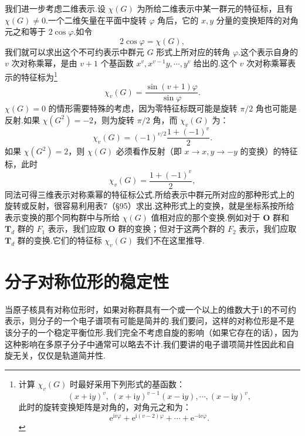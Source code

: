 我们进一步考虑二维表示.设 $\chi(G)$ 为所给二维表示中某一群元的特征标，且有 $\chi(G)\neq0$.一个二维矢量在平面中旋转 $\varphi$ 角后，它的 $x,y$ 分量的变换矩阵的对角元之和等于 $2\cos\varphi$.如令
\begin{equation}
  2\cos\varphi=\chi(G),
\end{equation}
我们就可以求出这个不可约表示中群元 $G$ 形式上所对应的转角 $\varphi$.这个表示自身的 $v$ 次对称乘幂，是由 $v+1$ 个基函数 $x^v,x^{v-1}y,\cdots,y^v$ 给出的.这个 $v$ 次对称乘幂表示的特征标为\footnote{计算 $\chi_v(G)$ 时最好采用下列形式的基函数：
\begin{equation*}
  (x+\mathrm{i}y)^v,\ (x+\mathrm{i}y)^{v-1}(x-\mathrm{i}y),\cdots,(x-\mathrm{i}y)^v,
\end{equation*}
此时的旋转变换矩阵是对角的，对角元之和为：
\begin{equation*}
  \mathrm{e}^{\mathrm{i}v\varphi}+\mathrm{e}^{\mathrm{i}(v-2)\varphi}+\cdots+\mathrm{e}^{-\mathrm{i}v\varphi}.
\end{equation*}}
\begin{equation}
  \chi_v(G)=\frac{\sin(v+1)\varphi}{\sin\varphi}.
\end{equation}
$\chi(G)=0$ 的情形需要特殊的考虑，因为零特征标既可能是旋转 $\pi/2$ 角也可能是反射.如果 $\chi(G^2)=-2$，则为旋转 $\pi/2$ 角，而 $\chi_v(G)$ 为：
\begin{equation}
  \chi_v(G)=(-1)^{v/2}\frac{1+(-1)^v}{2}.
\end{equation}
如果 $\chi(G^2)=2$，则 $\chi(G)$ 必须看作反射（即 $x\longrightarrow x,y\longrightarrow-y$ 的变换）的特征标，此时
\begin{equation}
  \chi_v(G)=\frac{1+(-1)^v}{2},
\end{equation}
同法可得三维表示对称乘幂的特征标公式.所给表示中群元所对应的那种形式上的旋转或反射，很容易利用表7（§95）求出.这种形式上的变换，就是坐标系按所给表示变换的那个同构群中与所给 $\chi(G)$ 值相对应的那个变换.例如对于 $\boldsymbol{O}$ 群和 $\boldsymbol{T}_d$ 群的 $F_1$ 表示，我们应取 $\boldsymbol{O}$ 群的变换；但对于这两个群的 $F_2$ 表示，我们应取 $\boldsymbol{T}_d$ 群的变换.它们的特征标 $\chi_v(G)$ 我们不在这里推导.

\section{分子对称位形的稳定性}

当原子核具有对称位形时，如果对称群具有一个或一个以上的维数大于1的不可约表示，则分子的一个电子谱项有可能是简并的.我们要问，这样的对称位形是不是该分子的一个稳定平衡位形.我们完全不考虑自旋的影响（如果它存在的话），因为这种影响在多原子分子中通常可以略去不计.我们要讲的电子谱项简并性因此和自旋无关，仅仅是轨道简并性.

